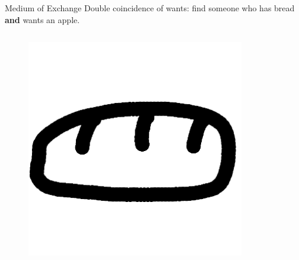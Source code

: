 \documentclass[]{beamer}
\begin{document}
\begin{frame}{Medium of Exchange}
	Double coincidence of wants: find someone who has bread \textcolor{focus}{\textbf{and}} wants an apple.
	\begin{columns}
		\begin{column}{0.5\textwidth}
			\begin{figure}
				\begin{center}
					\includegraphics[height = 0.1\textheight]{../assets/images/bread}
				\end{center}
			\end{figure}
		\end{column}
		\begin{column}{0.5\textwidth}
			\begin{figure}
				\begin{center}

\end{center}
\end{figure}
\end{column}
\end{columns}
\end{frame}
\end{document}
